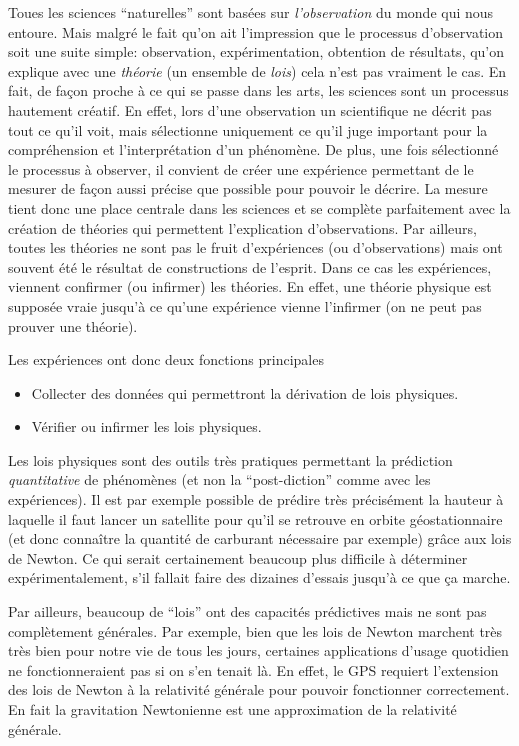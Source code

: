 \documentclass[a4paper,12pt]{book}
\begin{document}
Toues les sciences ``naturelles'' sont basées sur \textit{l'observation} du monde qui nous entoure. 
Mais malgré le fait qu'on ait l'impression que le processus d’observation soit une suite simple:
observation, expérimentation, obtention de résultats, qu'on explique avec une \textit{théorie} (un ensemble de \textit{lois}) cela n'est pas vraiment le cas. En fait,
de façon proche à ce qui se passe dans les arts, les sciences sont un processus hautement créatif. 
En effet, lors d'une observation un scientifique ne décrit pas tout ce qu'il voit, 
mais sélectionne uniquement ce qu'il juge important
pour la compréhension et l'interprétation d'un phénomène. De plus, une fois sélectionné
le processus à observer, il convient de créer une expérience permettant de le mesurer de façon aussi précise que possible
pour pouvoir le décrire. La mesure tient donc une place centrale dans les sciences et se complète parfaitement avec la création de théories
qui permettent l'explication d'observations. Par ailleurs, toutes les théories ne sont pas le fruit
d'expériences (ou d'observations) mais ont souvent été le résultat de constructions de l'esprit. 
Dans ce cas les expériences, viennent confirmer (ou infirmer) les théories. En effet, une théorie physique est
supposée vraie jusqu'à ce qu'une expérience vienne l'infirmer (on ne peut pas prouver une théorie).

Les expériences ont donc deux fonctions principales
\begin{itemize}
 \item Collecter des données qui permettront la dérivation de lois physiques.
 \item Vérifier ou infirmer les lois physiques.
\end{itemize}

Les lois physiques sont des outils très pratiques permettant la prédiction \textit{quantitative} 
de phénomènes (et non la ``post-diction'' comme avec les expériences). Il est par exemple possible de prédire très précisément la hauteur à laquelle il faut lancer un satellite 
pour qu'il se retrouve en orbite géostationnaire (et donc connaître la quantité de carburant nécessaire par exemple) grâce aux lois de Newton. 
Ce qui serait certainement beaucoup plus difficile à déterminer expérimentalement, s'il fallait faire des dizaines d'essais jusqu'à ce que ça marche.

Par ailleurs, beaucoup de ``lois'' ont des capacités prédictives mais ne sont pas complètement générales. Par exemple, bien que les lois de Newton 
marchent très très bien pour notre vie de tous les jours, certaines applications d'usage quotidien ne fonctionneraient pas si on s'en tenait là. 
En effet, le GPS requiert l'extension des lois de Newton à la relativité générale pour pouvoir fonctionner correctement. En fait
la gravitation Newtonienne est une approximation de la relativité générale.
\end{document}
